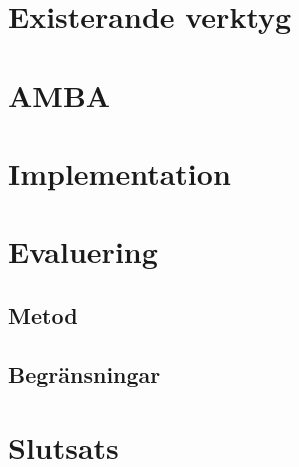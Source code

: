 \documentclass[12pt, a4paper]{report}
\begin{document}
\chapter{Existerande verktyg}


\chapter{AMBA}


\chapter{Implementation}


\chapter{Evaluering}

\section{Metod}

\section{Begränsningar}


\chapter{Slutsats}


\printbibliography
\end{document}
